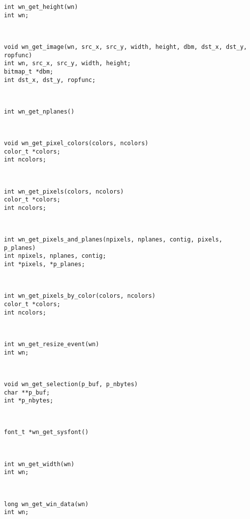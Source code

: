 \parbox[t]{5in}{\tt int wn\_get\_height(wn)\\int wn;}\> \pageref{wn_get_height}\\[0.1in]
\parbox[t]{5in}{\tt void wn\_get\_image(wn, src\_x, src\_y, width, height, dbm, dst\_x, dst\_y, ropfunc)\\int wn, src\_x, src\_y, width, height;\\bitmap\_t *dbm;\\int dst\_x, dst\_y, ropfunc;}\> \pageref{wn_get_image}\\[0.1in]
\parbox[t]{5in}{\tt int wn\_get\_nplanes()}\> \pageref{wn_get_nplanes}\\[0.1in]
\parbox[t]{5in}{\tt void wn\_get\_pixel\_colors(colors, ncolors)\\color\_t *colors;\\int ncolors;}\> \pageref{wn_get_pixel_colors}\\[0.1in]
\parbox[t]{5in}{\tt int wn\_get\_pixels(colors, ncolors)\\color\_t *colors;\\int ncolors;}\> \pageref{wn_get_pixels}\\[0.1in]
\parbox[t]{5in}{\tt int wn\_get\_pixels\_and\_planes(npixels, nplanes, contig, pixels, p\_planes)\\int npixels, nplanes, contig;\\int *pixels, *p\_planes;}\> \pageref{wn_get_pixels_and_planes}\\[0.1in]
\parbox[t]{5in}{\tt int wn\_get\_pixels\_by\_color(colors, ncolors)\\color\_t *colors;\\int ncolors;}\> \pageref{wn_get_pixels_by_color}\\[0.1in]
\parbox[t]{5in}{\tt int wn\_get\_resize\_event(wn)\\int wn;}\> \pageref{wn_get_resize_event}\\[0.1in]
\parbox[t]{5in}{\tt void wn\_get\_selection(p\_buf, p\_nbytes)\\char **p\_buf;\\int *p\_nbytes;}\> \pageref{wn_get_selection}\\[0.1in]
\parbox[t]{5in}{\tt font\_t *wn\_get\_sysfont()}\> \pageref{wn_get_sysfont}\\[0.1in]
\parbox[t]{5in}{\tt int wn\_get\_width(wn)\\int wn;}\> \pageref{wn_get_width}\\[0.1in]
\parbox[t]{5in}{\tt long wn\_get\_win\_data(wn)\\int wn;}\> \pageref{wn_get_win_data}\\[0.1in]
